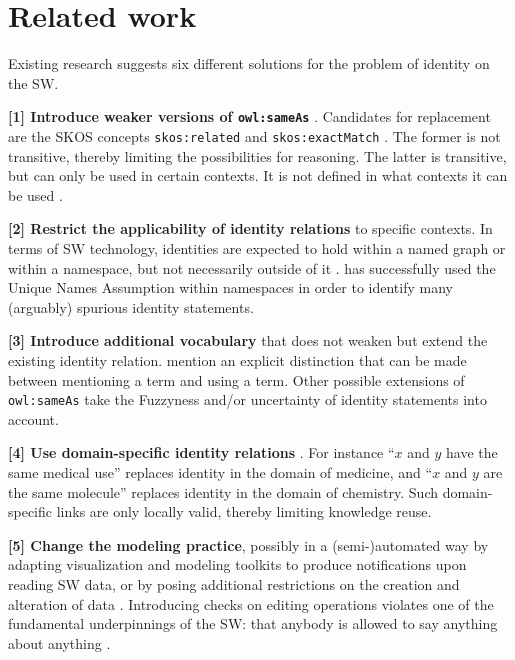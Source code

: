 \section{Related work}
\label{sec:related_work}

Existing research suggests six different solutions for
  the problem of identity on the SW.

\textbf{[1] Introduce weaker versions of {\small \texttt{owl:sameAs}}}
  \cite{HalpinHayes2010,MccuskerMcguinness2010}.
Candidates for replacement are
  the SKOS concepts
  {\small \texttt{skos:related}} and {\small \texttt{skos:exactMatch}}
  \cite{MilesBechhofer2009}.
The former is not transitive,
  thereby limiting the possibilities for reasoning.
The latter is transitive,
  but can only be used in certain contexts.
It is not defined in what contexts it can be used
  \cite{MilesBechhofer2009}.

\textbf{[2] Restrict the applicability of identity relations}
  to specific contexts.
In terms of SW technology, identities are expected to hold
  within a named graph or within a namespace,
  but not necessarily outside of it \cite{HalpinHayes2010}.
\cite{Melo2013} has successfully used the Unique Names Assumption
  within namespaces in order to identify many (arguably) spurious
  identity statements.

\textbf{[3] Introduce additional vocabulary} that does not weaken but extend
  the existing identity relation.
\cite{HalpinHayes2010} mention an explicit distinction that can be made
  between mentioning a term and using a term.
Other possible extensions of {\small \texttt{owl:sameAs}} take
  the Fuzzyness and/or uncertainty of identity statements into account.

\textbf{[4] Use domain-specific identity relations}
  \cite{MccuskerMcguinness2010}.
For instance
    ``$x$ and $y$ have the same medical use''
  replaces
    identity in the domain of medicine,
and
    ``$x$ and $y$ are the same molecule''
  replaces
    identity in the domain of chemistry.
Such domain-specific links are only locally valid,
  thereby limiting knowledge reuse.

\textbf{[5] Change the modeling practice}, possibly in a (semi-)automated way
  by adapting visualization and modeling toolkits to produce notifications
  upon reading SW data, or by posing additional restrictions on the creation
  and alteration of data
  \cite{HalpinHayes2010,DingShinavierFininMcguinness2010}.
Introducing checks on editing operations violates
  one of the fundamental underpinnings of the SW:
  that anybody is allowed to say anything about anything
  \cite{AntoniouGrothHarmelenHoekstra2012}.

